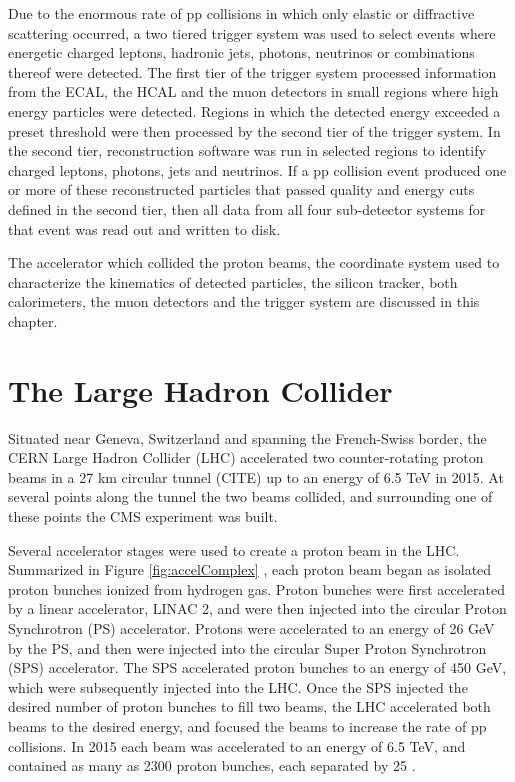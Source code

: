 Due to the enormous rate of pp collisions in which only elastic or diffractive scattering occurred, a two tiered trigger 
system was used to select events where energetic charged leptons, hadronic jets, photons, neutrinos or combinations 
thereof were detected.  The first tier of the trigger system processed information from the ECAL, the HCAL and the muon 
detectors in small regions where high energy particles were detected.  Regions in which the detected energy exceeded 
a preset threshold were then processed by the second tier of the trigger system.  In the second tier, reconstruction software 
was run in selected regions to identify charged leptons, photons, jets and neutrinos.  If a pp collision event produced one 
or more of these reconstructed particles that passed quality and energy cuts defined in the second tier, then all data 
from all four sub-detector systems for that event was read out and written to disk.

The accelerator which collided the proton beams, the coordinate system used to characterize the kinematics of detected 
particles, the silicon tracker, both calorimeters, the muon detectors and the trigger system are discussed in this chapter.

\section{The Large Hadron Collider}
\label{sec:lhcDescription}
Situated near Geneva, Switzerland and spanning the French-Swiss border, the CERN Large Hadron Collider (LHC) accelerated 
two counter-rotating proton beams in a 27 km circular tunnel (CITE) up to an energy of 6.5 TeV in 2015.  At several points along the tunnel 
the two beams collided, and surrounding one of these points the CMS experiment was built.

Several accelerator stages were used to create a proton beam in the LHC.  Summarized in Figure \ref{fig:accelComplex} \cite{DeMelis:2197559}, each 
proton beam began as isolated proton bunches ionized from hydrogen gas.  Proton bunches were first accelerated by a linear 
accelerator, LINAC 2, and were then injected into the circular Proton Synchrotron (PS) accelerator.  Protons were accelerated 
to an energy of 26 GeV by the PS, and then were injected into the circular Super Proton Synchrotron (SPS) accelerator.  
The SPS accelerated proton bunches to an energy of 450 GeV, which were subsequently injected into the LHC.  Once the SPS 
injected the desired number of proton bunches to fill two beams, the LHC accelerated both beams to the desired energy, 
and focused the beams to increase the rate of pp collisions.  In 2015 each beam was accelerated to an energy of 6.5 TeV, and 
contained as many as 2300 proton bunches, each separated by 25 \ns.

